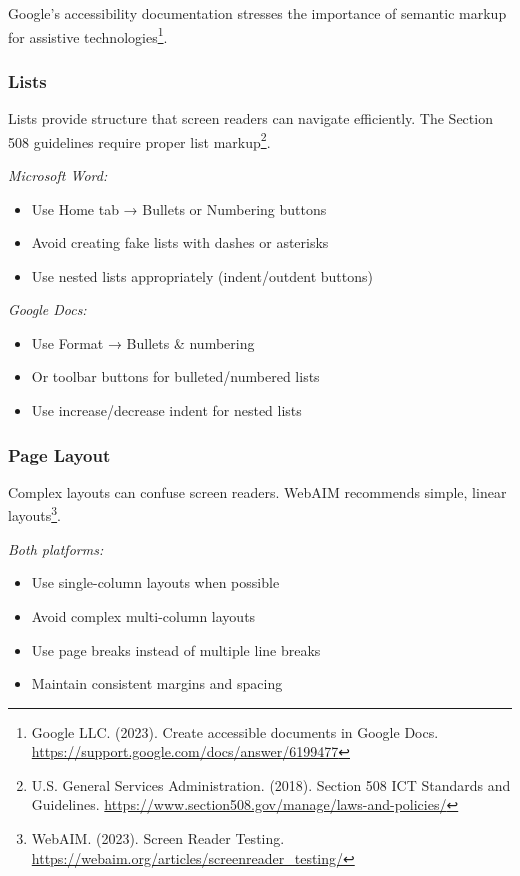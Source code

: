 Google's accessibility documentation stresses the importance of semantic markup for assistive technologies\footnote{Google LLC. (2023). Create accessible documents in Google Docs. \url{https://support.google.com/docs/answer/6199477}}.

\subsubsection{Lists}
Lists provide structure that screen readers can navigate efficiently. The Section 508 guidelines require proper list markup\footnote{U.S. General Services Administration. (2018). Section 508 ICT Standards and Guidelines. \url{https://www.section508.gov/manage/laws-and-policies/}}.

\emph{Microsoft Word:}
\begin{itemize}
\item Use Home tab → Bullets or Numbering buttons
\item Avoid creating fake lists with dashes or asterisks
\item Use nested lists appropriately (indent/outdent buttons)
\end{itemize}

\emph{Google Docs:}
\begin{itemize}
\item Use Format → Bullets \& numbering
\item Or toolbar buttons for bulleted/numbered lists
\item Use increase/decrease indent for nested lists
\end{itemize}

\subsubsection{Page Layout}
Complex layouts can confuse screen readers. WebAIM recommends simple, linear layouts\footnote{WebAIM. (2023). Screen Reader Testing. \url{https://webaim.org/articles/screenreader_testing/}}.

\emph{Both platforms:}
\begin{itemize}
\item Use single-column layouts when possible
\item Avoid complex multi-column layouts
\item Use page breaks instead of multiple line breaks
\item Maintain consistent margins and spacing
\end{itemize}

